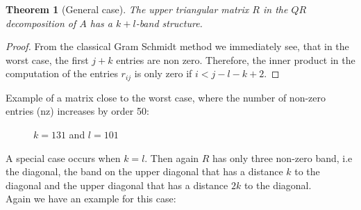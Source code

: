 \documentclass{article}
\numberwithin{pic}{section}
\numberwithin{lem}{section}
\newtheorem{thm}{Theorem}
\numberwithin{thm}{section}
\numberwithin{cor}{section}
\theoremstyle{definition}
\numberwithin{ex}{section}
\numberwithin{defn}{section}
\theoremstyle{definition}
\theoremstyle{remark}
\begin{document}
\begin{thm}[General case]
The upper triangular matrix $R$ in the $QR$ decomposition of $A$ has a $k+l$-band structure.
\end{thm}
\begin{proof}
From the classical Gram Schmidt method we immediately see, that in the worst case, the first $j+k$ entries are non zero.
Therefore, the inner product in the computation of the entries $r_{ij}$ is only zero if $i<j-l-k+2$. 
\end{proof}
Example of a matrix close to the worst case, where the number of non-zero entries (nz) increases by order 50:
\begin{figure}[H] 

    \caption{$k=131$ and $l=101$}
\end{figure} 
A special case occurs when $k=l$. Then again $R$ has only three non-zero band, i.e the diagonal, the band on the upper diagonal that has a distance $k$ to the diagonal and the upper diagonal that has a distance $2k$ to the diagonal.\\
Again we have an example for this case:
\end{document}
